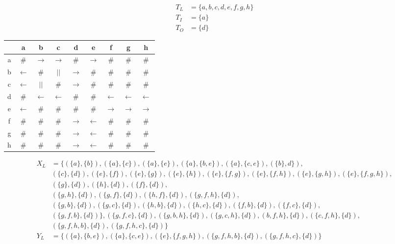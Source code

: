 \begin{align*}
T_L &= \{ a,b,c,d,e,f,g,h\}\\
T_I &= \{a\}\\
T_O &= \{d\}
\end{align*}
\begin{tabular}{c | c c c c c c c c}
	&a 	  		  &b 			 &c 			&d 	  			&e 			   &f			&g			&h\\
	\hline
a	&$\#$ 		  &$\rightarrow$ &$\rightarrow$	&$\#$ 			&$\rightarrow$ &$\#$		&$\#$
   	&$\#$\\
b	&$\leftarrow$ &$\#$			 &$||$ 			&$\rightarrow$	&$\#$ 		   &$\#$		&$\#$	
	&$\#$\\
c	&$\leftarrow$ &$||$			 &$\#$			&$\rightarrow$  &$\#$ 		   &$\#$		&$\#$	
	&$\#$\\
d	&$\#$ 		  &$\leftarrow$  &$\leftarrow$	&$\#$			&$\#$ 		   &$\leftarrow$
	&$\leftarrow$ &$\leftarrow$\\
e	&$\leftarrow$ &$\#$ 		 &$\#$			&$\#$  			&$\#$		   &$\rightarrow$
	&$\rightarrow$	&$\rightarrow$\\
f	&$\#$ 		  &$\#$			 &$\#$			&$\rightarrow$	&$\leftarrow$  &$\#$		&$\#$     
&$\#$\\
g	&$\#$ 		  &$\#$			 &$\#$			&$\rightarrow$	&$\leftarrow$  &$\#$		&$\#$     
&$\#$\\
h	&$\#$ 		  &$\#$			 &$\#$			&$\rightarrow$	&$\leftarrow$  &$\#$		&$\#$     
&$\#$\\
\end{tabular}

\begin{align*}
X_L &= \{ (\{a\},\{b\}),(\{a\},\{c\})
,(\{a\},\{e\}),(\{a\},\{b,e\}),(\{a\},\{c,e\}),(\{b\},d\}),\\
&(\{c\},\{d\}),(\{e\},\{f\}),(\{e\},\{g\}),(\{e\},\{h\}),(\{e\},\{f,g\}),(\{e\},\{f,h\}),(\{e\},\{g,h\}),(\{e\},\{f,g,h\}),\\
&(\{g\},\{d\}),(\{h\},\{d\}),(\{f\},\{d\}),\\
&(\{g,h\},\{d\}),(\{g,f\},\{d\}),(\{h,f\},\{d\}),(\{g,f,h\},\{d\}),\\
&(\{g,b\},\{d\}),(\{g,c\},\{d\}),(\{h,b\},\{d\}),(\{h,c\},\{d\}),(\{f,b\},\{d\}),(\{f,c\},\{d\}),\\
&(\{g,f,b\},\{d\})\},(\{g,f,c\},\{d\}),(\{g,b,h\},\{d\}),(\{g,c,h\},\{d\}),(b,f,h\},\{d\}),(\{c,f,h\},\{d\}),\\
&(\{g,f,h,b\},\{d\}),(\{g,f,h,c\},\{d\})\}\\
Y_L &=
\{(\{a\},\{b,e\}),(\{a\},\{c,e\}),(\{e\},\{f,g,h\}),(\{g,f,h,b\},\{d\}),(\{g,f,h,c\},\{d\})\}\\
\end{align*}


